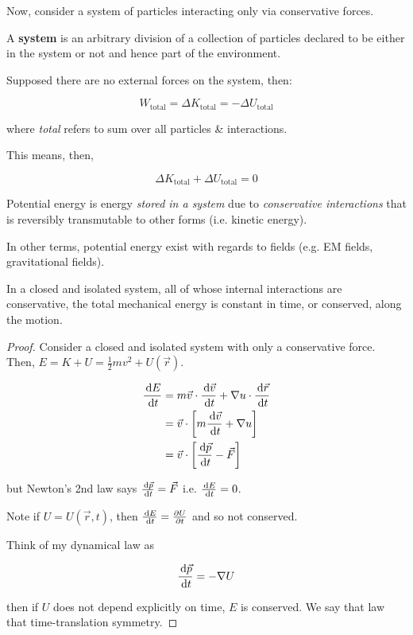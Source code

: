 Now, consider a system of particles interacting only via conservative forces.

A \textbf{system} is an arbitrary division of a collection of particles declared to be either in the system or not and hence part of the environment.

Supposed there are no external forces on the system, then:

\begin{equation}
	W_\mathrm{total} = \Delta K_\mathrm{total} = - \Delta U_\mathrm{total}
\end{equation}

where \textit{total} refers to sum over all particles \& interactions.

This means, then, 

\begin{equation}
	\Delta K_\mathrm{total} + \Delta U_\mathrm{total} = 0
\end{equation}

Potential energy is energy \textit{stored in a system} due to \textit{conservative interactions} that is reversibly transmutable to other forms (i.e. kinetic energy).

In other terms, potential energy exist with regards to fields (e.g. EM fields, gravitational fields).

\begin{definition}
	In a closed and isolated system, all of whose internal interactions are conservative, the total mechanical energy is constant in time, or conserved, along the motion.
\end{definition}

\begin{proof}
	Consider a closed and isolated system with only a conservative force. Then, $E = K + U = \frac{1}{2}mv^2 + U(\vec r)$.

	\begin{align}
		\frac{\D E}{\D t} &= m\vec v \cdot \frac{\D \vec v}{\D t} + \nabla u \cdot \frac{\D \vec r}{\D t}\\
		&= \vec v \cdot \left[m \frac{\D \vec v}{\D t} + \nabla u\right]\\
		&= \vec v \cdot \left[\frac{\D \vec p}{\D t} - \vec F\right]
	\end{align}

	but Newton's 2nd law says $\frac{\D \vec p}{\D t} = \vec F$ i.e. $\frac{\D E}{\D t} = 0$.

	Note if $U = U(\vec r, t)$, then $\frac{\D E}{\D t} = \frac{\partial U}{\partial t}$ and so not conserved.

	Think of my dynamical law as 

	\begin{equation}
		\frac{\D \vec p}{\D t} = -\nabla U
	\end{equation}

	then if $U$ does not depend explicitly on time, $E$ is conserved. We say that law that time-translation symmetry.
\end{proof}

